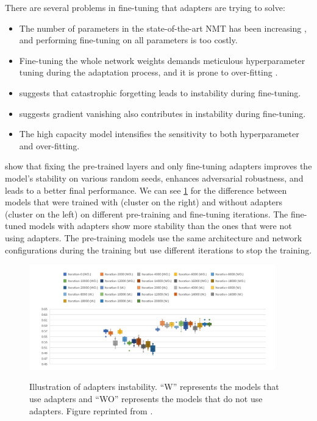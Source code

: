 There are several problems in fine-tuning that adapters are trying to solve:
\begin{itemize}
    \item The number of parameters in the state-of-the-art NMT has been increasing , and performing fine-tuning on all parameters is too costly.
    \item Fine-tuning the whole network weights demands meticulous hyperparameter tuning during the adaptation process, and it is prone to over-fitting .
    \item {} suggests that catastrophic forgetting leads to instability during fine-tuning.
    \item {} suggests gradient vanishing also contributes in instability during fine-tuning.
    \item The high capacity model intensifies the sensitivity to both hyperparameter and over-fitting.
\end{itemize}

 show that fixing the pre-trained layers and only fine-tuning adapters improves the model's stability on various random seeds, enhances adversarial robustness, and leads to a better final performance. We can see \cref{img:adapters_instability} for the difference between models that were trained with (cluster on the right) and without adapters (cluster on the left) on different pre-training and fine-tuning iterations. The fine-tuned models with adapters show more stability than the ones that were not using adapters. The pre-training models use the same architecture and network configurations during the training but use different iterations to stop the training.

\begin{figure}[h]
    {\includegraphics[width=0.95\textwidth]{img/adapters_instability.png}}
    \centering
    \caption{Illustration of adapters instability. ``W'' represents the models that use adapters and ``WO'' represents the models that do not use adapters. Figure reprinted from \cite{han2021robust}.}
    \label{img:adapters_instability}
\end{figure}

